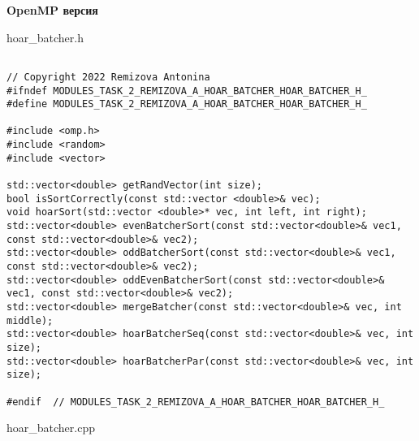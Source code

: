 \documentclass{report}
\begin{document}
\textbf{OpenMP версия}
\par hoar\_batcher.h
\begin{lstlisting}

// Copyright 2022 Remizova Antonina
#ifndef MODULES_TASK_2_REMIZOVA_A_HOAR_BATCHER_HOAR_BATCHER_H_
#define MODULES_TASK_2_REMIZOVA_A_HOAR_BATCHER_HOAR_BATCHER_H_

#include <omp.h>
#include <random>
#include <vector>

std::vector<double> getRandVector(int size);
bool isSortCorrectly(const std::vector <double>& vec);
void hoarSort(std::vector <double>* vec, int left, int right);
std::vector<double> evenBatcherSort(const std::vector<double>& vec1, const std::vector<double>& vec2);
std::vector<double> oddBatcherSort(const std::vector<double>& vec1, const std::vector<double>& vec2);
std::vector<double> oddEvenBatcherSort(const std::vector<double>& vec1, const std::vector<double>& vec2);
std::vector<double> mergeBatcher(const std::vector<double>& vec, int middle);
std::vector<double> hoarBatcherSeq(const std::vector<double>& vec, int size);
std::vector<double> hoarBatcherPar(const std::vector<double>& vec, int size);

#endif  // MODULES_TASK_2_REMIZOVA_A_HOAR_BATCHER_HOAR_BATCHER_H_

\end{lstlisting}
\par hoar\_batcher.cpp
\end{document}
